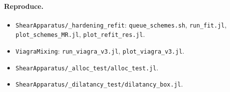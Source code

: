 \documentclass[11pt,a4paper]{article}
\begin{document}
\paragraph{Reproduce.}
\begin{itemize}
\item \texttt{ShearApparatus/\_hardening\_refit}: \texttt{queue\_schemes.sh}, \texttt{run\_fit.jl}, \texttt{plot\_schemes\_MR.jl}, \texttt{plot\_refit\_res.jl}.
\item \texttt{ViagraMixing}: \texttt{run\_viagra\_v3.jl}, \texttt{plot\_viagra\_v3.jl}.
\item \texttt{ShearApparatus/\_alloc\_test/alloc\_test.jl}.
\item \texttt{ShearApparatus/\_dilatancy\_test/dilatancy\_box.jl}.
\end{itemize}
\end{document}
